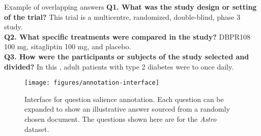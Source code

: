 \begin{subbox}[width=1\linewidth, center]{Example of overlapping answers}
\small
\textbf{Q1. What was the study design or setting of the trial?}
This trial is a multicentre, randomized, double-blind, phase 3 study.\\

\textbf{Q2. What specific treatments were compared in the study?}
DBPR108 100 mg, sitagliptin 100 mg, and placebo.\\

\textbf{Q3. How were the participants or subjects of the study selected and divided?}
In this , adult patients with type 2 diabetes were  to  once daily. 
\end{subbox}

\begin{figure*}
\texttt{[image: figures/annotation-interface]}
\caption{Interface for question salience annotation. Each question can be expanded to show an illustrative answer sourced from a randomly chosen document. The questions shown here are for the \emph{Astro} dataset.}
\end{figure*}
